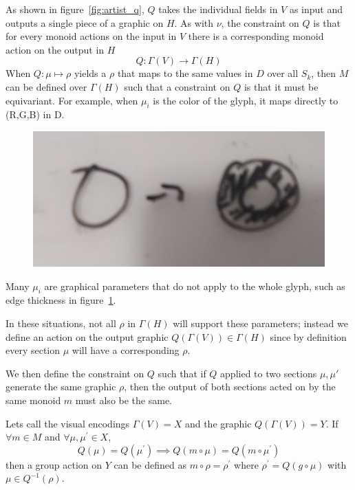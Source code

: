 \documentclass[../main.tex]{subfiles}
\begin{document}
As shown in figure~\ref{fig:artist_q}, $Q$ takes the individual fields in $V$ as input and outputs a single piece of a graphic on $H$. As with $\nu$, the constraint on $Q$ is that for every monoid actions on the input in $V$ there is a corresponding monoid action on the output in $H$
\begin{equation}
    Q: \Gamma(V) \rightarrow \Gamma(H)
\end{equation}
When $Q: \mu \mapsto \rho$ yields a $\rho$ that maps to the same values in $D$ over all $S_k$, then $M$ can be defined over $\Gamma(H)$ such that a constraint on $Q$ is that it must be equivariant. For example, when $\mu_{i}$ is the color of the glyph, it maps directly to (R,G,B) in D.

\begin{figure}[ht!]
    \includegraphics[width=\textwidth]{figures/math/diff_type_q.png}
    \label{fig:artist_mark_change}
\end{figure}

Many $\mu_{i}$ are graphical parameters that do not apply to the whole glyph, such as edge thickness in figure~\ref{fig:artist_mark_change}. 

In these situations, not all  $\rho$ in $\Gamma(H)$ will support these parameters; instead we define an action on the output graphic $Q(\Gamma(V)) \in \Gamma(H)$ since by definition every section $\mu$ will have a corresponding $\rho$.

We then define the constraint on $Q$ such that if $Q$ applied to two sections $\mu, \mu\prime$ generate the same graphic $\rho$, then the output of both sections acted on by the same monoid $m$ must also be the same.    

Lets call the visual encodings $\Gamma(V)=X$ and the graphic $Q(\Gamma(V))=Y$. If $\forall m \in M$ and $\forall \mu, \mu^\prime \in X$, 
\begin{equation}
Q(\mu) = Q(\mu^\prime)\implies Q(m\circ\mu) = Q(m\circ\mu^\prime)
\end{equation}
then a group action on $Y$ can be defined as $m\circ \rho = \rho^\prime$ where $\rho^\prime=Q(g\circ \mu)$ with $\mu \in Q^{-1}(\rho)$. 
\end{document}
